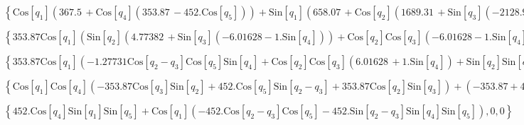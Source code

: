 \documentclass{article}
\begin{document}
\begin{doublespace}
\noindent\(\left\{\text{Cos}\left[q_1\right] \left(367.5\, +\text{Cos}\left[q_4\right] \left(353.87\, -452. \text{Cos}\left[q_5\right]\right)\right)+\text{Sin}\left[q_1\right]
\left(658.07\, +\text{Cos}\left[q_2\right] \left(1689.31\, +\text{Sin}\left[q_3\right] \left(-2128.98-353.87 \text{Sin}\left[q_4\right]\right)\right)-452.
\text{Cos}\left[q_5\right] \text{Sin}\left[q_2-q_3\right] \text{Sin}\left[q_4\right]+\text{Cos}\left[q_3\right] \text{Sin}\left[q_2\right] \left(2128.98\,
+353.87 \text{Sin}\left[q_4\right]\right)+452. \text{Cos}\left[q_2-q_3\right] \text{Sin}\left[q_5\right]\right),0,0\right\}\)
\end{doublespace}

\begin{doublespace}
\noindent\(\left\{353.87 \text{Cos}\left[q_1\right] \left(\text{Sin}\left[q_2\right] \left(4.77382\, +\text{Sin}\left[q_3\right] \left(-6.01628-1.
\text{Sin}\left[q_4\right]\right)\right)+\text{Cos}\left[q_2\right] \text{Cos}\left[q_3\right] \left(-6.01628-1. \text{Sin}\left[q_4\right]\right)+1.27731
\text{Cos}\left[q_2-q_3\right] \text{Cos}\left[q_5\right] \text{Sin}\left[q_4\right]+1.27731 \text{Sin}\left[q_2-q_3\right] \text{Sin}\left[q_5\right]\right),0,0\right\}\)
\end{doublespace}

\begin{doublespace}
\noindent\(\left\{353.87 \text{Cos}\left[q_1\right] \left(-1.27731 \text{Cos}\left[q_2-q_3\right] \text{Cos}\left[q_5\right] \text{Sin}\left[q_4\right]+\text{Cos}\left[q_2\right]
\text{Cos}\left[q_3\right] \left(6.01628\, +1. \text{Sin}\left[q_4\right]\right)+\text{Sin}\left[q_2\right] \text{Sin}\left[q_3\right] \left(6.01628\,
+1. \text{Sin}\left[q_4\right]\right)-1.27731 \text{Sin}\left[q_2-q_3\right] \text{Sin}\left[q_5\right]\right),0,0\right\}\)
\end{doublespace}

\begin{doublespace}
\noindent\(\left\{\text{Cos}\left[q_1\right] \text{Cos}\left[q_4\right] \left(-353.87 \text{Cos}\left[q_3\right] \text{Sin}\left[q_2\right]+452.
\text{Cos}\left[q_5\right] \text{Sin}\left[q_2-q_3\right]+353.87 \text{Cos}\left[q_2\right] \text{Sin}\left[q_3\right]\right)+\left(-353.87+452.
\text{Cos}\left[q_5\right]\right) \text{Sin}\left[q_1\right] \text{Sin}\left[q_4\right],0,0\right\}\)
\end{doublespace}

\begin{doublespace}
\noindent\(\left\{452. \text{Cos}\left[q_4\right] \text{Sin}\left[q_1\right] \text{Sin}\left[q_5\right]+\text{Cos}\left[q_1\right] \left(-452. \text{Cos}\left[q_2-q_3\right]
\text{Cos}\left[q_5\right]-452. \text{Sin}\left[q_2-q_3\right] \text{Sin}\left[q_4\right] \text{Sin}\left[q_5\right]\right),0,0\right\}\)
\end{doublespace}
\end{document}
